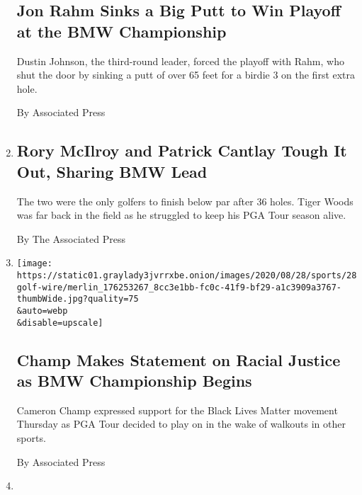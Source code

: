 \begin{enumerate}
  \hypertarget{jon-rahm-sinks-a-big-putt-to-win-playoff-at-the-bmw-championship}{%
  \subsection{Jon Rahm Sinks a Big Putt to Win Playoff at the BMW
  Championship}\label{jon-rahm-sinks-a-big-putt-to-win-playoff-at-the-bmw-championship}}

  Dustin Johnson, the third-round leader, forced the playoff with Rahm,
  who shut the door by sinking a putt of over 65 feet for a birdie 3 on
  the first extra hole.

  By Associated Press
\item
  \href{/2020/08/28/sports/golf/tiger-woods-rory-mcilroy-bmw-championship.html}{}

  \hypertarget{rory-mcilroy-and-patrick-cantlay-tough-it-out-sharing-bmw-lead}{%
  \subsection{Rory McIlroy and Patrick Cantlay Tough It Out, Sharing BMW
  Lead}\label{rory-mcilroy-and-patrick-cantlay-tough-it-out-sharing-bmw-lead}}

  The two were the only golfers to finish below par after 36 holes.
  Tiger Woods was far back in the field as he struggled to keep his PGA
  Tour season alive.

  By The Associated Press
\item
  \href{/2020/08/28/sports/golf/cameron-champ-bmw-championship.html}{}

  \texttt{[image: https://static01.graylady3jvrrxbe.onion/images/2020/08/28/sports/28golf-wire/merlin\_176253267\_8cc3e1bb-fc0c-41f9-bf29-a1c3909a3767-thumbWide.jpg?quality=75\\\&auto=webp\\\&disable=upscale]}

  \hypertarget{champ-makes-statement-on-racial-justice-as-bmw-championship-begins}{%
  \subsection{Champ Makes Statement on Racial Justice as BMW
  Championship
  Begins}\label{champ-makes-statement-on-racial-justice-as-bmw-championship-begins}}

  Cameron Champ expressed support for the Black Lives Matter movement
  Thursday as PGA Tour decided to play on in the wake of walkouts in
  other sports.

  By Associated Press
\item
  \href{/2020/08/23/sports/golf/northern-trust-scores-dustin-johnson.html}{}


\end{enumerate}
